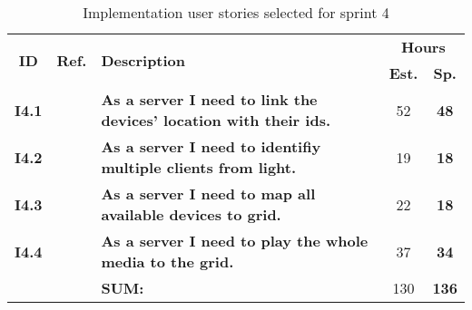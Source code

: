  \def\arraystretch{1.25}
 
\begin{longtable}{ccXcc}
  \label{tab:sprint4stories}\\[-6mm]
\caption{Implementation user stories selected for sprint 4}\\[-4mm]

\toprule[0.5mm]
\multirow{2}{*}{\textbf{ID}} &
\multirow{2}{*}{\textbf{Ref.}} & \multirow{2}{*}{\textbf{Description}} & \multicolumn{2}{c}{\textbf{Hours}} \\
 					& & & \textbf{Est.} & \textbf{Sp.} \\
\midrule
\textbf{I4.1} 	& 	& {\bf As a server I need to link the devices' location with their ids.}	 &  52	& \textbf{48} \\

\textbf{I4.2} 	& 	& {\bf As a server I need to identifiy multiple clients from light.}		 &  19	& \textbf{18} \\

\textbf{I4.3} 	& 	& {\bf As a server I need to map all available devices to grid.} 			 & 22 & \textbf{18} \\	

\textbf{I4.4} 	& 	& {\bf As a server I need to play the whole media to the grid.} 			 & 37 & \textbf{34} \\
	
\midrule
		
				&& \textbf{SUM:}		&		130	& \textbf{136}
 \\																			
\bottomrule[0.5mm]
\end{longtable}
